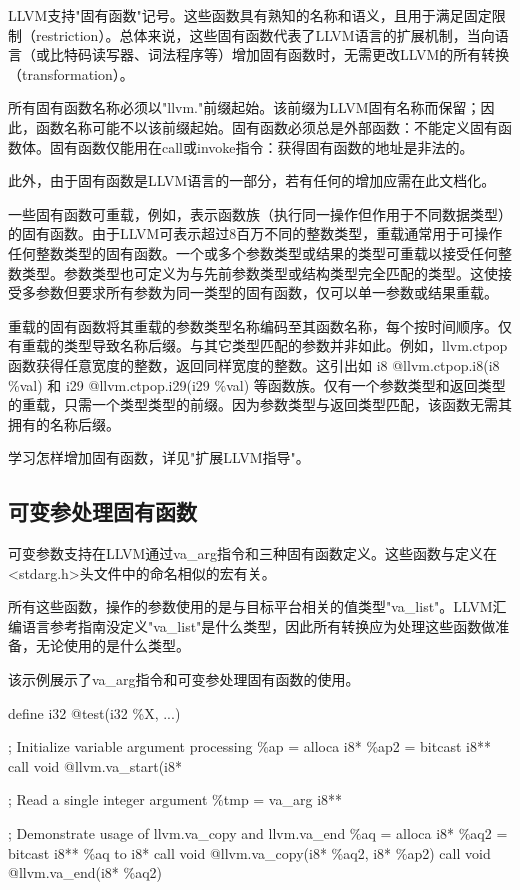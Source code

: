 \documentclass[12pt,a4paper]{article}
\begin{document}
{LLVM支持"固有函数"记号。这些函数具有熟知的名称和语义，且用于满足固定限制（restriction）。总体来说，这些固有函数代表了LLVM语言的扩展机制，当向语言（或比特码读写器、词法程序等）增加固有函数时，无需更改LLVM的所有转换（transformation）。

所有固有函数名称必须以"llvm."前缀起始。该前缀为LLVM固有名称而保留；因此，函数名称可能不以该前缀起始。固有函数必须总是外部函数：不能定义固有函数体。固有函数仅能用在call或invoke指令：获得固有函数的地址是非法的。

此外，由于固有函数是LLVM语言的一部分，若有任何的增加应需在此文档化。

一些固有函数可重载，例如，表示函数族（执行同一操作但作用于不同数据类型）的固有函数。由于LLVM可表示超过8百万不同的整数类型，重载通常用于可操作任何整数类型的固有函数。一个或多个参数类型或结果的类型可重载以接受任何整数类型。参数类型也可定义为与先前参数类型或结构类型完全匹配的类型。这使接受多参数但要求所有参数为同一类型的固有函数，仅可以单一参数或结果重载。

重载的固有函数将其重载的参数类型名称编码至其函数名称，每个按时间顺序。仅有重载的类型导致名称后缀。与其它类型匹配的参数并非如此。例如，llvm.ctpop函数获得任意宽度的整数，返回同样宽度的整数。这引出如 i8 @llvm.ctpop.i8(i8 \%val) 和 i29 @llvm.ctpop.i29(i29 \%val) 等函数族。仅有一个参数类型和返回类型的重载，只需一个类型类型的前缀。因为参数类型与返回类型匹配，该函数无需其拥有的名称后缀。

学习怎样增加固有函数，详见"扩展LLVM指导"。

\subsection{可变参处理固有函数}

可变参数支持在LLVM通过va\_arg指令和三种固有函数定义。这些函数与定义在<stdarg.h>头文件中的命名相似的宏有关。

所有这些函数，操作的参数使用的是与目标平台相关的值类型"va\_list"。LLVM汇编语言参考指南没定义"va\_list"是什么类型，因此所有转换应为处理这些函数做准备，无论使用的是什么类型。

该示例展示了va\_arg指令和可变参处理固有函数的使用。

define i32 @test(i32 \%X, ...) {
  ; Initialize variable argument processing
  \%ap = alloca i8*
  \%ap2 = bitcast i8** %
  call void @llvm.va\_start(i8* %

  ; Read a single integer argument
  \%tmp = va\_arg i8** %

  ; Demonstrate usage of llvm.va\_copy and llvm.va\_end
  \%aq = alloca i8*
  \%aq2 = bitcast i8** \%aq to i8*
  call void @llvm.va\_copy(i8* \%aq2, i8* \%ap2)
  call void @llvm.va\_end(i8* \%aq2)

}}
\end{document}
